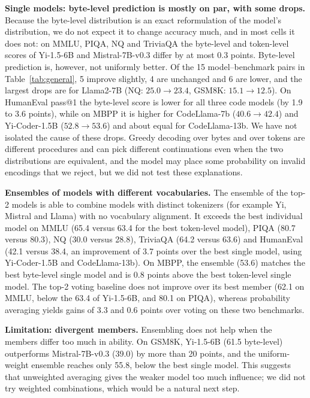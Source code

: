 \documentclass{article} %
\begin{document}
\textbf{Single models: byte-level prediction is mostly on par, with some drops.} Because the byte-level distribution is an exact reformulation of the model's distribution, we do not expect it to change accuracy much, and in most cells it does not: on MMLU, PIQA, NQ and TriviaQA the byte-level and token-level scores of Yi-1.5-6B and Mistral-7B-v0.3 differ by at most 0.3 points. Byte-level prediction is, however, not uniformly better. Of the 15 model--benchmark pairs in Table~\ref{tab:general}, 5 improve slightly, 4 are unchanged and 6 are lower, and the largest drops are for Llama2-7B (NQ: $25.0\to23.4$, GSM8K: $15.1\to12.5$). On HumanEval pass@1 the byte-level score is lower for all three code models (by 1.9 to 3.6 points), while on MBPP it is higher for CodeLlama-7b ($40.6\to42.4$) and Yi-Coder-1.5B ($52.8\to53.6$) and about equal for CodeLlama-13b. We have not isolated the cause of these drops. Greedy decoding over bytes and over tokens are different procedures and can pick different continuations even when the two distributions are equivalent, and the model may place some probability on invalid encodings that we reject, but we did not test these explanations.

\textbf{Ensembles of models with different vocabularies.} The ensemble of the top-2 models is able to combine models with distinct tokenizers (for example Yi, Mistral and Llama) with no vocabulary alignment. It exceeds the best individual model on MMLU (65.4 versus 63.4 for the best token-level model), PIQA (80.7 versus 80.3), NQ (30.0 versus 28.8), TriviaQA (64.2 versus 63.6) and HumanEval (42.1 versus 38.4, an improvement of 3.7 points over the best single model, using Yi-Coder-1.5B and CodeLlama-13b). On MBPP, the ensemble (53.6) matches the best byte-level single model and is 0.8 points above the best token-level single model. The top-2 voting baseline does not improve over its best member (62.1 on MMLU, below the 63.4 of Yi-1.5-6B, and 80.1 on PIQA), whereas probability averaging yields gains of 3.3 and 0.6 points over voting on these two benchmarks.

\textbf{Limitation: divergent members.} Ensembling does not help when the members differ too much in ability. On GSM8K, Yi-1.5-6B (61.5 byte-level) outperforms Mistral-7B-v0.3 (39.0) by more than 20 points, and the uniform-weight ensemble reaches only 55.8, below the best single model. This suggests that unweighted averaging gives the weaker model too much influence; we did not try weighted combinations, which would be a natural next step.
\end{document}
